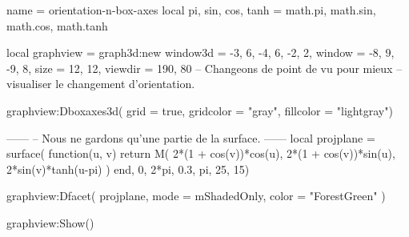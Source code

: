 \documentclass{standalone}
\begin{document}
\begin{luadraw}{name = orientation-n-box-axes}
local pi, sin, cos, tanh = math.pi, math.sin, math.cos, math.tanh

local graphview = graph3d:new{
  window3d = {-3, 6, -4, 6, -2, 2},
  window   = {-8, 9, -9, 8},
  size     = {12, 12},
  viewdir  = {190, 80}  -- Changeons de point de vu pour mieux
                        -- visualiser le changement d'orientation.
}

graphview:Dboxaxes3d({
  grid      = true,
  gridcolor = "gray",
  fillcolor = "lightgray"})

------
-- Nous ne gardons qu'une partie de la surface.
------
local projplane = surface(
  function(u, v)
    return M(
      2*(1 + cos(v))*cos(u),
      2*(1 + cos(v))*sin(u),
      2*sin(v)*tanh(u-pi)
    )
  end,
  0, 2*pi, 0.3, pi,
  {25, 15})

graphview:Dfacet(
  projplane,
  {
    mode  = mShadedOnly,
    color = "ForestGreen"
  })

graphview:Show()
\end{luadraw}
\end{document}
